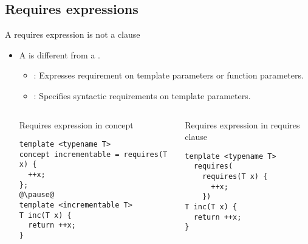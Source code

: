 \subsection{Requires expressions}

\begin{frame}[t,fragile]{A requires expression is not a clause}
\begin{itemize}
  \item A  is different from a 
       .
    \begin{itemize}
      \item {}:
            Expresses requirement on template parameters or function parameters.

      \item {}:
            Specifies syntactic requirements on template parameters.
    \end{itemize}

\pause
\begin{columns}[T]

\begin{block}{Requires expression in concept}
\begin{lstlisting}[escapechar=@]
template <typename T>
concept incrementable = requires(T x) {
  ++x;
};
@\pause@
template <incrementable T>
T inc(T x) {
  return ++x;
}
\end{lstlisting}
\end{block}

\pause
{}
\begin{block}{Requires expression in requires clause}
\begin{lstlisting}
template <typename T>
  requires(
    requires(T x) { 
      ++x; 
    })
T inc(T x) {
  return ++x;
}
\end{lstlisting}
\end{block}

\end{columns}

\end{itemize}
\end{frame}

